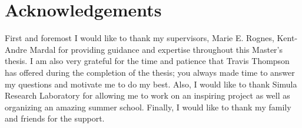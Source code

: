 \chapter{Acknowledgements}

First and foremost I would like to thank my supervisors, Marie E. Rognes, Kent-Andre Mardal for providing guidance and expertise throughout this Master's thesis. I am also very grateful for the time and patience that Travis Thompson has offered during the completion of the thesis; you always made time to answer my questions and motivate me to do my best. Also, I would like to thank Simula Research Laboratory for allowing me to work on an inspiring project as well as organizing an amazing summer school. Finally, I would like to thank my family and friends for the support.
